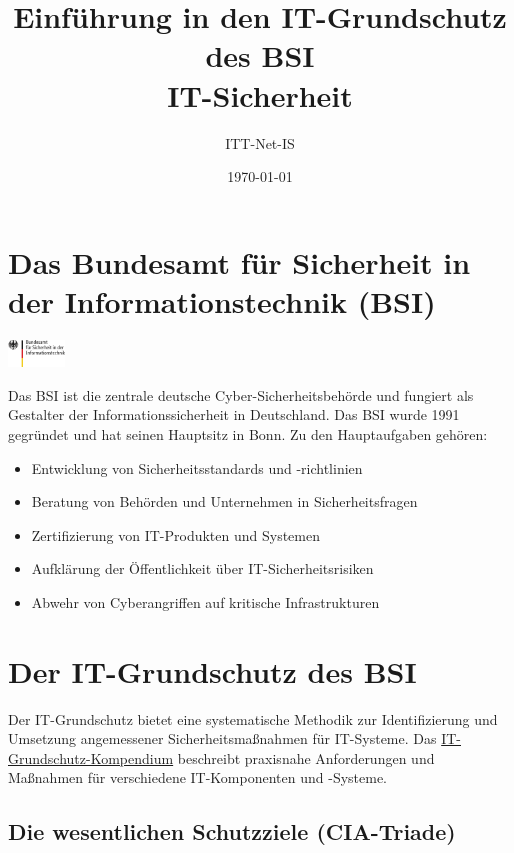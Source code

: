 \documentclass{orgstandard}
\author{ITT-Net-IS}
\date{\today}
\title{Einführung in den IT-Grundschutz des BSI\\\medskip
\large IT-Sicherheit}
\begin{document}
\maketitle



\section{Das Bundesamt für Sicherheit in der Informationstechnik (BSI)}
\label{sec:org33594a8}

\begin{center}
\includegraphics[width=1.5cm]{img/BSI_logo.png}
\end{center}

Das BSI ist die zentrale deutsche Cyber-Sicherheitsbehörde und fungiert als Gestalter der Informationssicherheit in Deutschland. Das BSI wurde 1991 gegründet und hat seinen Hauptsitz in Bonn.
Zu den Hauptaufgaben gehören:
\begin{itemize}
\item Entwicklung von Sicherheitsstandards und -richtlinien
\item Beratung von Behörden und Unternehmen in Sicherheitsfragen
\item Zertifizierung von IT-Produkten und Systemen
\item Aufklärung der Öffentlichkeit über IT-Sicherheitsrisiken
\item Abwehr von Cyberangriffen auf kritische Infrastrukturen
\end{itemize}

\section{Der IT-Grundschutz des BSI}
\label{sec:orgcfd561d}

Der IT-Grundschutz bietet eine systematische Methodik zur Identifizierung und Umsetzung angemessener Sicherheitsmaßnahmen für IT-Systeme. Das \href{https://www.bsi.bund.de/DE/Themen/Unternehmen-und-Organisationen/Standards-und-Zertifizierung/IT-Grundschutz/IT-Grundschutz-Kompendium/it-grundschutz-kompendium\_node.html}{IT-Grundschutz-Kompendium} beschreibt praxisnahe Anforderungen und Maßnahmen für verschiedene IT-Komponenten und -Systeme.

\subsection{Die wesentlichen Schutzziele (CIA-Triade)}
\label{sec:org5f4babf}
\end{document}
